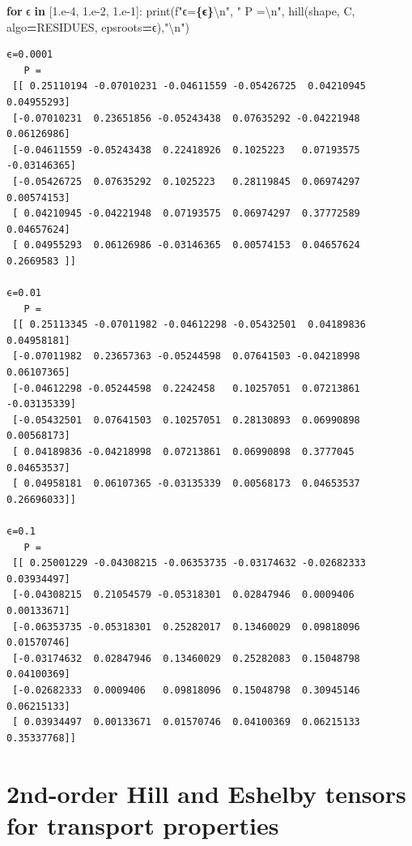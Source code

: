 \documentclass[
  a4paper,
  numbers=noendperiod,
  DIV=12]{scrreprt}
\newenvironment{Shaded}{\begin{snugshade}}{\end{snugshade}}
\newcommand{\BuiltInTok}[1]{#1}
\newcommand{\CharTok}[1]{\textcolor[rgb]{0.31,0.60,0.02}{#1}}
\newcommand{\ControlFlowTok}[1]{\textcolor[rgb]{0.13,0.29,0.53}{\textbf{#1}}}
\newcommand{\FloatTok}[1]{\textcolor[rgb]{0.00,0.00,0.81}{#1}}
\newcommand{\KeywordTok}[1]{\textcolor[rgb]{0.13,0.29,0.53}{\textbf{#1}}}
\newcommand{\NormalTok}[1]{#1}
\newcommand{\OperatorTok}[1]{\textcolor[rgb]{0.81,0.36,0.00}{\textbf{#1}}}
\newcommand{\SpecialCharTok}[1]{\textcolor[rgb]{0.81,0.36,0.00}{\textbf{#1}}}
\newcommand{\SpecialStringTok}[1]{\textcolor[rgb]{0.31,0.60,0.02}{#1}}
\newcommand{\StringTok}[1]{\textcolor[rgb]{0.31,0.60,0.02}{#1}}
\begin{document}
\begin{Shaded}
\begin{Highlighting}[]
\ControlFlowTok{for}\NormalTok{ ϵ }\KeywordTok{in}\NormalTok{ [}\FloatTok{1.e{-}4}\NormalTok{, }\FloatTok{1.e{-}2}\NormalTok{, }\FloatTok{1.e{-}1}\NormalTok{]:}
    \BuiltInTok{print}\NormalTok{(}\SpecialStringTok{f"ϵ=}\SpecialCharTok{\{ϵ\}}\CharTok{\textbackslash{}n}\SpecialStringTok{"}\NormalTok{, }\StringTok{"  P =}\CharTok{\textbackslash{}n}\StringTok{"}\NormalTok{, hill(shape, C, algo}\OperatorTok{=}\NormalTok{RESIDUES, epsroots}\OperatorTok{=}\NormalTok{ϵ),}\StringTok{"}\CharTok{\textbackslash{}n}\StringTok{"}\NormalTok{)}
\end{Highlighting}
\end{Shaded}

\begin{verbatim}
ϵ=0.0001
   P =
 [[ 0.25110194 -0.07010231 -0.04611559 -0.05426725  0.04210945  0.04955293]
 [-0.07010231  0.23651856 -0.05243438  0.07635292 -0.04221948  0.06126986]
 [-0.04611559 -0.05243438  0.22418926  0.1025223   0.07193575 -0.03146365]
 [-0.05426725  0.07635292  0.1025223   0.28119845  0.06974297  0.00574153]
 [ 0.04210945 -0.04221948  0.07193575  0.06974297  0.37772589  0.04657624]
 [ 0.04955293  0.06126986 -0.03146365  0.00574153  0.04657624  0.2669583 ]] 

ϵ=0.01
   P =
 [[ 0.25113345 -0.07011982 -0.04612298 -0.05432501  0.04189836  0.04958181]
 [-0.07011982  0.23657363 -0.05244598  0.07641503 -0.04218998  0.06107365]
 [-0.04612298 -0.05244598  0.2242458   0.10257051  0.07213861 -0.03135339]
 [-0.05432501  0.07641503  0.10257051  0.28130893  0.06990898  0.00568173]
 [ 0.04189836 -0.04218998  0.07213861  0.06990898  0.3777045   0.04653537]
 [ 0.04958181  0.06107365 -0.03135339  0.00568173  0.04653537  0.26696033]] 

ϵ=0.1
   P =
 [[ 0.25001229 -0.04308215 -0.06353735 -0.03174632 -0.02682333  0.03934497]
 [-0.04308215  0.21054579 -0.05318301  0.02847946  0.0009406   0.00133671]
 [-0.06353735 -0.05318301  0.25282017  0.13460029  0.09818096  0.01570746]
 [-0.03174632  0.02847946  0.13460029  0.25282083  0.15048798  0.04100369]
 [-0.02682333  0.0009406   0.09818096  0.15048798  0.30945146  0.06215133]
 [ 0.03934497  0.00133671  0.01570746  0.04100369  0.06215133  0.35337768]] 
\end{verbatim}

\section{2nd-order Hill and Eshelby tensors for transport
properties}\label{sec-hill2}
\end{document}

